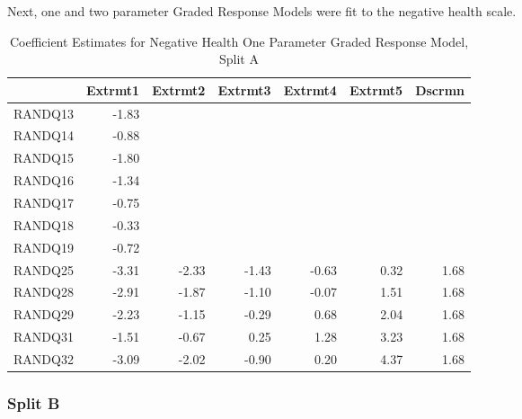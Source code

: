\documentclass{article}
\begin{document}
Next, one and two parameter Graded Response Models were fit to the negative health scale. 


\begin{table}[ht]
\centering
\begin{tabular}{rrrrrrr}
  \hline
 & Extrmt1 & Extrmt2 & Extrmt3 & Extrmt4 & Extrmt5 & Dscrmn \\ 
  \hline
RANDQ13 & -1.83 &  &  &  &  &  \\ 
  RANDQ14 & -0.88 &  &  &  &  &  \\ 
  RANDQ15 & -1.80 &  &  &  &  &  \\ 
  RANDQ16 & -1.34 &  &  &  &  &  \\ 
  RANDQ17 & -0.75 &  &  &  &  &  \\ 
  RANDQ18 & -0.33 &  &  &  &  &  \\ 
  RANDQ19 & -0.72 &  &  &  &  &  \\ 
  RANDQ25 & -3.31 & -2.33 & -1.43 & -0.63 & 0.32 & 1.68 \\ 
  RANDQ28 & -2.91 & -1.87 & -1.10 & -0.07 & 1.51 & 1.68 \\ 
  RANDQ29 & -2.23 & -1.15 & -0.29 & 0.68 & 2.04 & 1.68 \\ 
  RANDQ31 & -1.51 & -0.67 & 0.25 & 1.28 & 3.23 & 1.68 \\ 
  RANDQ32 & -3.09 & -2.02 & -0.90 & 0.20 & 4.37 & 1.68 \\ 
   \hline
\end{tabular}
\caption{Coefficient Estimates for Negative Health One Parameter Graded Response Model, Split A} 
\end{table}
\subsubsection{Split B}
\label{sec:split-b-1}
\end{document}
